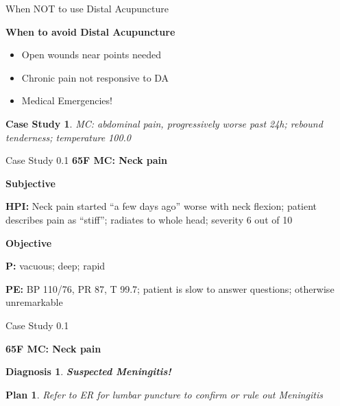 \documentclass{beamer}
\begin{document}
\begin{frame}{When NOT to use Distal Acupuncture} %
  
  \textbf{\Large When to avoid Distal Acupuncture}
  \begin{itemize} \itemsep1.5em
  \item Open wounds near points needed
  \item Chronic pain not responsive to DA
  \item Medical Emergencies!
  \end{itemize}

  \newtheorem{t1.6}{Case Study}
  \begin{t1.6}
    MC: abdominal pain, progressively worse past 24h; rebound tenderness; temperature 100.0
  \end{t1.6}
  
\end{frame}

\begin{frame}{Case Study 0.1} %
  \textbf{\Large 65F MC: Neck pain}
  
  \textbf{\large Subjective}
  
  \textbf{HPI:} Neck pain started ``a few days ago'' worse with neck flexion; patient describes pain as ``stiff''; radiates to whole head; severity 6 out of 10

  \textbf{\large Objective}
  
  \textbf{P:} vacuous; deep; rapid

  \textbf{PE:} BP 110/76, PR 87, T 99.7; patient is slow to answer questions; otherwise unremarkable

\end{frame}

\begin{frame}{Case Study 0.1} %
  \newtheorem{dx}{Diagnosis}
  \newtheorem{pln}{Plan}
  \textbf{\Large 65F MC: Neck pain}

  \begin{dx}
    \textbf{Suspected Meningitis!}
  \end{dx}

  \begin{pln}
    Refer to ER for lumbar puncture to confirm or rule out Meningitis
  \end{pln}

\end{frame}
  
\end{document}
